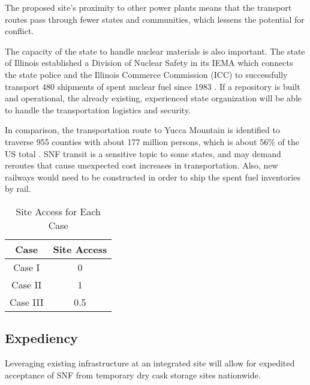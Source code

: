 The proposed site's proximity to other power plants means that the transport
routes pass through fewer states and communities, which lessens the potential 
for conflict.

The capacity of the state to handle nuclear materials is also important.
The state of Illinois established a Division of Nuclear Safety in its \gls{IEMA}
which connects the state police and the Illinois Commerce Commission (ICC) to
 successfully transport 480 shipments of spent nuclear fuel since 1983
 \cite{iema_illinois_2005}. If a repository is built and operational, the already existing,
 experienced state organization will be able to handle the transportation logistics
 and security.  

In comparison, the 
transportation route to Yucca Mountain is identified to traverse 955 counties
with about 177 million persons, which is about 56\% of the US total
 \cite{halstead_yucca_2011}. \gls{SNF} transit is a sensitive topic to some states, and may
 demand reroutes that cause unexpected cost increases in transportation. Also,
 new railways would need to be constructed in order to ship the spent fuel inventories
 by rail. 


\begin{table}[h]
	\centering
        \caption {Site Access for Each Case}
		\begin{tabular}{|c|c|}
			\hline
			Case & Site Access \\
			\hline
			Case I & 0 \\
			Case II & 1 \\
			Case III & 0.5\\ 
			\hline
                \end{tabular}
\end{table}



\subsection{Expediency}



Leveraging existing infrastructure at an integrated site will allow for 
expedited acceptance of \gls{SNF} from temporary dry cask storage sites 
nationwide.

